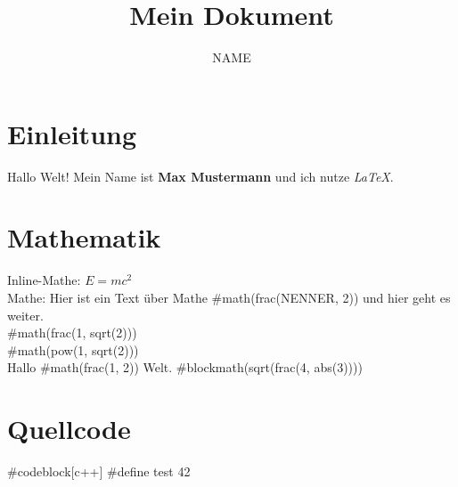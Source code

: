 \documentclass{article}
\title{Mein Dokument}
\author{NAME}
\begin{document}
\maketitle

\section{Einleitung}
Hallo Welt! 
Mein Name ist \textbf{Max Mustermann} und ich nutze \textit{LaTeX}.

\section{Mathematik}
Inline-Mathe: $E = mc^2$  \\
Mathe: Hier ist ein Text über Mathe #math(frac(NENNER, 2)) und hier geht es weiter.\\  

#math(frac(1, sqrt(2))) \\

#math(pow(1, sqrt(2))) \\

Hallo #math(frac(1, 2)) Welt.  
#blockmath(sqrt(frac(4, abs(3))))



\section{Quellcode}

#codeblock[c++]{
#define test 42
}
\end{document}
